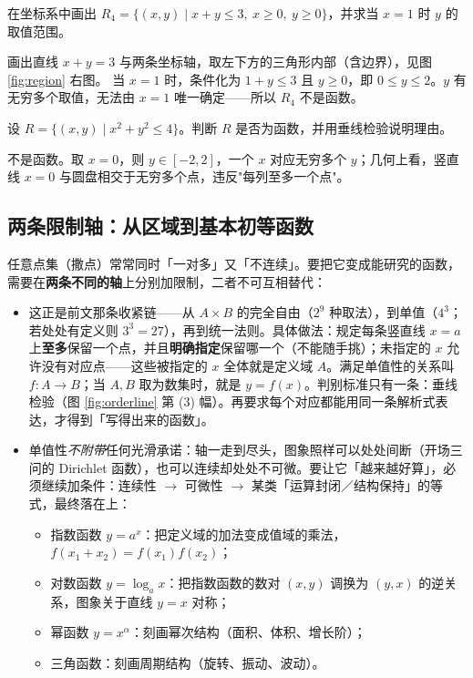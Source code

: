 \begin{explore}
\begin{example}
在坐标系中画出 $R_4=\{(x,y)\mid x+y\leq3,\ x\geq0,\ y\geq0\}$，并求当 $x=1$ 时 $y$ 的取值范围。
\end{example}
\begin{solution}
画出直线 $x+y=3$ 与两条坐标轴，取左下方的三角形内部（含边界），见图 \ref{fig:region} 右图。
当 $x=1$ 时，条件化为 $1+y\leq3$ 且 $y\geq0$，即 $0\leq y\leq2$。$y$ 有无穷多个取值，无法由 $x=1$ 唯一确定——所以 $R_4$ 不是函数。
\end{solution}

\begin{problem}
设 $R=\{(x,y)\mid x^2+y^2\leq4\}$。判断 $R$ 是否为函数，并用垂线检验说明理由。
\end{problem}
\begin{solution}
不是函数。取 $x=0$，则 $y\in[-2,2]$，一个 $x$ 对应无穷多个 $y$；几何上看，竖直线 $x=0$ 与圆盘相交于无穷多个点，违反"每列至多一个点"。
\end{solution}

\subsection{两条限制轴：从区域到基本初等函数}


任意点集（撒点）常常同时「一对多」又「不连续」。要把它变成能研究的函数，需要在\textbf{两条不同的轴}上分别加限制，二者不可互相替代：

\begin{itemize}
  \item {}这正是前文那条收紧链——从 $A\times B$ 的完全自由（$2^9$ 种取法），到单值（$4^3$；若处处有定义则 $3^3=27$），再到统一法则。具体做法：规定每条竖直线 $x=a$ 上\textbf{至多}保留一个点，并且\textbf{明确指定}保留哪一个（不能随手挑）；未指定的 $x$ 允许没有对应点——这些被指定的 $x$ 全体就是定义域 $A$。满足单值性的关系叫 $f:A\to B$；当 $A,B$ 取为数集时，就是 $y=f(x)$。判别标准只有一条：垂线检验（图 \ref{fig:orderline} 第 (3) 幅）。再要求每个对应都能用同一条解析式表达，才得到「写得出来的函数」。
  \item {}单值性\emph{不附带}任何光滑承诺：轴一走到尽头，图象照样可以处处间断（开场三问的 Dirichlet 函数），也可以连续却处处不可微。要让它「越来越好算」，必须继续加条件：连续性 $\to$ 可微性 $\to$ 某类「运算封闭／结构保持」的等式，最终落在上：
  \begin{itemize}
    \item 指数函数 $y=a^x$：把定义域的加法变成值域的乘法，$f(x_1+x_2)=f(x_1)f(x_2)$；
    \item 对数函数 $y=\log_a x$：把指数函数的数对 $(x,y)$ 调换为 $(y,x)$ 的逆关系，图象关于直线 $y=x$ 对称；
    \item 幂函数 $y=x^{\alpha}$：刻画幂次结构（面积、体积、增长阶）；
    \item 三角函数：刻画周期结构（旋转、振动、波动）。
  \end{itemize}
\end{itemize}


\end{explore}
